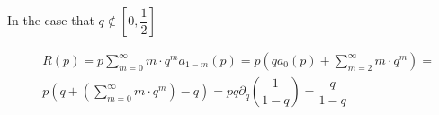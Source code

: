 \documentclass[letterpaper,12pt]{report}
\theoremstyle{plain}
\theoremstyle{definition}
\begin{document}
In the case  that $q\notin [0,\dfrac{1}{2}]$

\begin{eqnarray}\nonumber
&\mathit{R}(p)=p\sum_{m=0}^{\infty}m\cdot q^m\mathit{a}_{1-m}(p)=p\left(
q\mathit{a}_0(p)+\sum_{m=2}^{\infty}m\cdot q^m
 \right)=\\\nonumber
 & p\left(q+\left(\sum_{m=0}^{\infty}m\cdot q^m\right)-q \right) =pq\partial_q\left(\dfrac{1}{1-q}\right)=\dfrac{q}{1-q}
\end{eqnarray}


\newpage

\end{document}
